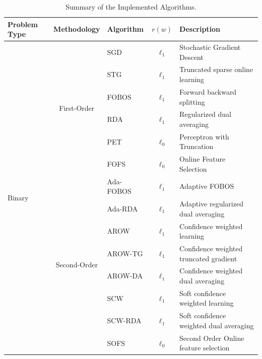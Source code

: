 \documentclass[11pt,a4paper]{article}
\begin{document}
\begin{table}[!htpb]
    \caption{Summary of the Implemented Algorithms.}
    \label{tab:summary-algorithms}
    \begin{small}
        \renewcommand{\arraystretch}{1.3}
        \begin{tabular}{l||c|l|c|l}
            \hline
            Problem Type   &  Methodology & Algorithm & $r(w)$& Description \\\hline \hline
            \multirow{14}{*}{Binary} &\multirow{6}{*}{\footnotesize First-Order}
            & SGD &$\ell_1$& {\footnotesize Stochastic Gradient Descent~\cite{rosenblatt1958perceptron}} \\\cline{3-5}
            & & STG &$\ell_1$& {\footnotesize Truncated sparse online learning~\cite{langford2009sparse}} \\\cline{3-5}
            & &FOBOS & $\ell_1$ & {\footnotesize Forward backward splitting~\cite{duchi2009efficient}}\\\cline{3-5}
            & &RDA &$\ell_1$& {\scriptsize Regularized dual averaging~\cite{xiao2010dual}} \\\cline{3-5}
            & &PET& $\ell_0$& {\scriptsize Perceptron with Truncation} \\\cline{3-5}
            & &FOFS & $\ell_0$& {\scriptsize Online Feature
                Selection~\cite{wang2013online}} \\\cline{2-5}
            &\multirow{8}{*}{\footnotesize Second-Order}
            &Ada-FOBOS &$\ell_1$& {\footnotesize Adaptive FOBOS~\cite{duchi2011adaptive}}\\\cline{3-5}
            & & Ada-RDA &$\ell_1$&Adaptive regularized dual averaging~\cite{duchi2011adaptive}\\\cline{3-5}
            & &AROW &$\ell_1$& Confidence weighted learning~\cite{crammer2009adaptive}\\\cline{3-5}
            Classification &&AROW-TG &$\ell_1$& Confidence weighted truncated gradient\\\cline{3-5}
            & &AROW-DA &$\ell_1$& Confidence weighted dual averaging\\\cline{3-5}
            & &SCW &$\ell_1$& Soft confidence weighted learning~\cite{wang2012exact}\\\cline{3-5}
            & &SCW-RDA &$\ell_1$& Soft confidence weighted dual averaging\\\cline{3-5}
            & &SOFS &$\ell_0$& Second Order Online feature selection\\\cline{3-5}
            \hline
        \end{tabular}
    \end{small}
    \renewcommand{\arraystretch}{1}
\end{table}
\end{document}

